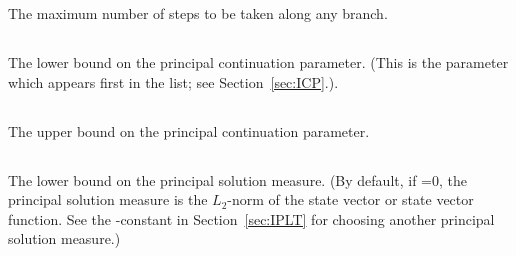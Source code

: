 
The maximum number of steps to be taken along any branch.

\subsection{}  \label{sec:RL0}


 The lower bound on the principal continuation parameter.
 (This is the parameter which appears first in the  list;
 see Section~\ref{sec:ICP}.). 


\subsection{}  \label{sec:RL1}


 The upper bound on the principal continuation parameter. 

\subsection{}  \label{sec:A0}


 The lower bound on the principal solution measure.
 (By default, if =0, the principal solution measure
 is the $L_2$-norm of the state vector or state vector function.
 See the \AUTO-constant  in Section~\ref{sec:IPLT} 
 for choosing another principal solution measure.)

